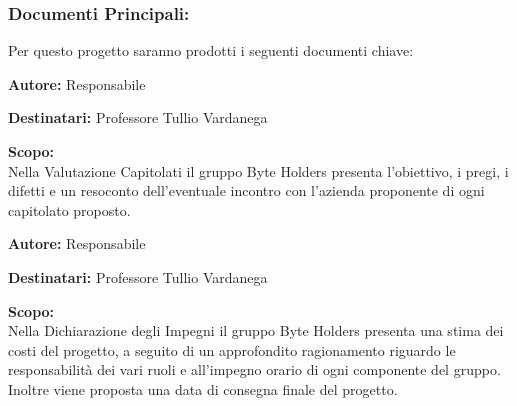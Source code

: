 \documentclass[a4paper, 11pt]{article}
\begin{document}
\subsubsection{Documenti Principali:} 
Per questo progetto saranno prodotti i seguenti documenti chiave:



\begin{tcolorbox}[
    colback=LightGray,       %
    colframe=AccentColor,    %
    coltitle=white,          %
    fonttitle=\bfseries\large,
    boxrule=0.5mm,           %
    arc=2mm,                 %
    title={Valutazione Capitolati} %
]
    \textbf{\textcolor{AccentDark}{Autore:}} Responsabile  %
    
    \vspace{0.2cm} %
    \textbf{\textcolor{AccentDark}{Destinatari:}} Professore Tullio Vardanega

    \vspace{0.2cm} %

    \textbf{\textcolor{AccentDark}{Scopo:}} \\
    Nella Valutazione Capitolati il gruppo Byte Holders presenta l'obiettivo, i pregi, i difetti e un resoconto dell'eventuale incontro con l'azienda proponente di ogni capitolato proposto.
\end{tcolorbox}


\begin{tcolorbox}[
    colback=LightGray,       %
    colframe=AccentColor,    %
    coltitle=white,          %
    fonttitle=\bfseries\large,
    boxrule=0.5mm,           %
    arc=2mm,                 %
    title={Dichiarazioni Impegni} %
]
    \textbf{\textcolor{AccentDark}{Autore:}} Responsabile  %
    
    \vspace{0.2cm} %
    \textbf{\textcolor{AccentDark}{Destinatari:}} Professore Tullio Vardanega

    \vspace{0.2cm} %

    \textbf{\textcolor{AccentDark}{Scopo:}} \\
   Nella Dichiarazione degli Impegni il gruppo Byte Holders presenta una stima dei costi del progetto, a seguito di un approfondito ragionamento riguardo le responsabilità dei vari ruoli e all'impegno orario di ogni componente del gruppo. 
   Inoltre viene proposta una data di consegna finale del progetto. 
\end{tcolorbox}
\end{document}
